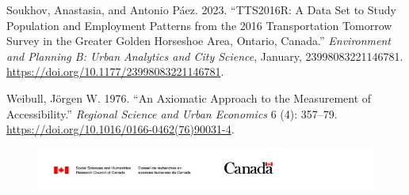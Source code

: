\documentclass[12pt, oneside]{report}
\newlength{\cslhangindent}
\newlength{\cslentryspacingunit} %
\newenvironment{CSLReferences}[2] %
 {%
  \setlength{\parindent}{0pt}
  \ifodd #1
  \let\oldpar\par
  \def\par{\hangindent=\cslhangindent\oldpar}
  \fi
  \setlength{\parskip}{#2\cslentryspacingunit}
 }%
 {}
\begin{document}
\begin{CSLReferences}{1}{0}
\leavevmode{}%
Soukhov, Anastasia, and Antonio Páez. 2023. {``{TTS2016R}: {A} Data Set
to Study Population and Employment Patterns from the 2016
{Transportation Tomorrow Survey} in the {Greater Golden Horseshoe} Area,
{Ontario}, {Canada}.''} \emph{Environment and Planning B: Urban
Analytics and City Science}, January, 23998083221146781.
\url{https://doi.org/10.1177/23998083221146781}.

\leavevmode{}%
Weibull, Jörgen W. 1976. {``An Axiomatic Approach to the Measurement of
Accessibility.''} \emph{Regional Science and Urban Economics} 6 (4):
357--79. \url{https://doi.org/10.1016/0166-0462(76)90031-4}.

\end{CSLReferences}

\newpage


\thispagestyle{empty}

\begin{center}
    \begin{figure}[b]
        \includegraphics[width=\textwidth]{images/sshrc-canada-banner.png}
    \end{figure}    
\end{center}
\end{document}
